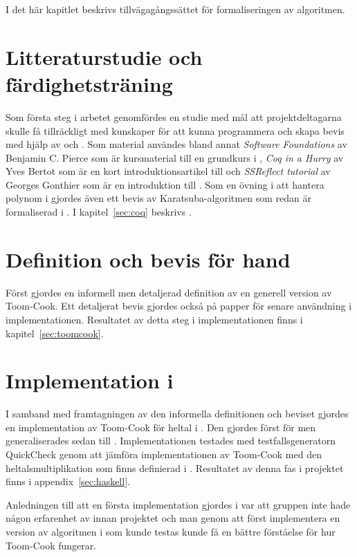I det här kapitlet beskrivs tillvägagångssättet för formaliseringen av algoritmen.

\section{Litteraturstudie och färdighetsträning}
Som första steg i arbetet genomfördes en studie med mål att projektdeltagarna
skulle få tillräckligt med kunskaper för att kunna programmera och skapa bevis
med hjälp av \coq{} och \ssr{}. Som material användes bland annat
\emph{Software Foundations} av Benjamin C. Pierce som är kursmaterial till en
grundkurs i \coq{}\cite{pierce2012software}, \emph{Coq in a Hurry} av Yves
Bertot som är en kort introduktionsartikel till \coq{}\cite{bertot2006coq} och
\emph{SSReflect tutorial} av Georges Gonthier som är en introduktion till
\ssr{} \cite{gonthier2009ssreflect}. Som en övning i att hantera polynom i \ssr
gjordes även ett bevis av Karatsuba-algoritmen som redan är formaliserad i
\coq{}. I kapitel~\ref{sec:coq} beskrivs \coq.

\section{Definition och bevis för hand}
Först gjordes en informell men detaljerad definition av en generell version av
Toom-Cook. Ett detaljerat bevis gjordes också på papper för senare användning i
implementationen. Resultatet av detta steg i implementationen finns i
kapitel~\ref{sec:toomcook}.

\section{Implementation i \haskell{}}
I samband med framtagningen av den informella definitionen och beviset gjordes
en implementation av Toom-Cook för heltal i \haskell{}. Den gjordes först för
 men generaliserades sedan till . Implementationen testades
med testfallsgeneratorn QuickCheck genom att jämföra implementationen av
Toom-Cook med den heltalsmultiplikation som finns definierad i \haskell{}.
Resultatet av denna fas i projektet finns i appendix~\ref{sec:haskell}.

Anledningen till att en första implementation gjordes i \haskell{} var att
gruppen inte hade någon erfarenhet av \coq{} innan projektet och man genom att
först implementera en version av algoritmen i \haskell{} som kunde testas
kunde få en bättre förståelse för hur Toom-Cook fungerar.

